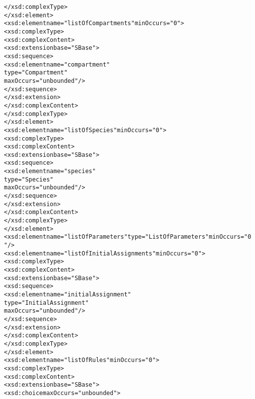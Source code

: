 \begin{alltt}
                        </xsd:complexType>
                    </xsd:element>
                    <xsd:element name="listOfCompartments" minOccurs="0">
                        <xsd:complexType>
                            <xsd:complexContent>
                                <xsd:extension base="SBase">
                                    <xsd:sequence>
                                        <xsd:element name="compartment" 
                                                     type="Compartment" 
                                                     maxOccurs="unbounded"/>
                                    </xsd:sequence>
                                </xsd:extension>
                            </xsd:complexContent>
                        </xsd:complexType>
                    </xsd:element>
                    <xsd:element name="listOfSpecies" minOccurs="0">
                        <xsd:complexType>
                            <xsd:complexContent>
                                <xsd:extension base="SBase">
                                    <xsd:sequence>
                                        <xsd:element name="species" 
                                                     type="Species" 
                                                     maxOccurs="unbounded"/>
                                    </xsd:sequence>
                                </xsd:extension>
                            </xsd:complexContent>
                        </xsd:complexType>
                    </xsd:element>
                    <xsd:element name="listOfParameters" type="ListOfParameters" minOccurs="0"/>
                    <xsd:element name="listOfInitialAssignments" minOccurs="0">
                        <xsd:complexType>
                            <xsd:complexContent>
                                <xsd:extension base="SBase">
                                    <xsd:sequence>
                                        <xsd:element name="initialAssignment" 
                                                     type="InitialAssignment" 
                                                     maxOccurs="unbounded"/>
                                    </xsd:sequence>
                                </xsd:extension>
                            </xsd:complexContent>
                        </xsd:complexType>
                    </xsd:element>
                    <xsd:element name="listOfRules" minOccurs="0">
                        <xsd:complexType>
                            <xsd:complexContent>
                                <xsd:extension base="SBase">
                                    <xsd:choice maxOccurs="unbounded">

\end{alltt}
